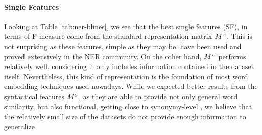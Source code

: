 \paragraph{Single Features}
Looking at Table \ref{tab:ner-blines}, we see that the best single features (SF), in terms of F-measure come from the standard representation matrix $M^{\scriptscriptstyle T}$. This is not surprising as these features, simple as they may be, have been used and proved extensively in the NER community. On the other hand, $M^{\scriptscriptstyle L}$ performs relatively well, considering it only includes information contained in the dataset itself. Nevertheless, this kind of representation is the foundation of most word embedding techniques used nowadays.
While we expected better results from the syntactical features $M^{\scriptscriptstyle S}$, as they are able to provide not only general word similarity, but also functional, getting close to synonymy-level \cite{LevyG14},  we believe that the relatively small size of the datasets do not provide enough information to generalize 



